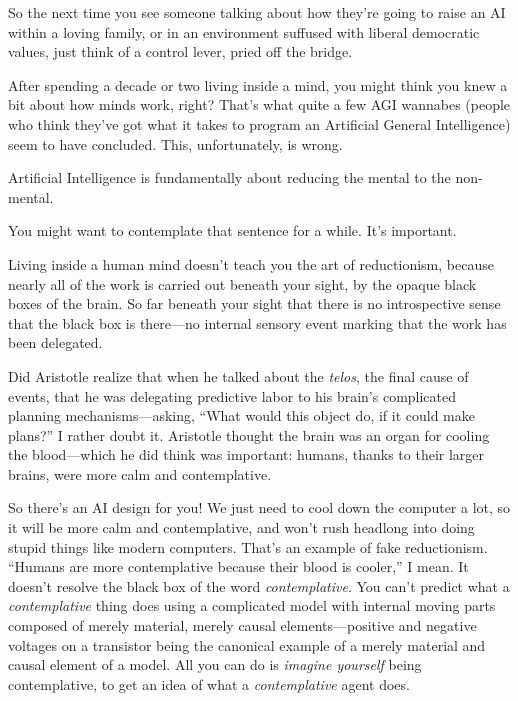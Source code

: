 {
 So the next time you see someone talking about how
they're going to raise an AI within a loving family, or
in an environment suffused with liberal democratic values, just think
of a control lever, pried off the bridge.}

\myendsectiontext


\bigskip


{
 After spending a decade or two living inside a mind, you might
think you knew a bit about how minds work, right?
That's what quite a few AGI wannabes (people who think
they've got what it takes to program an Artificial
General Intelligence) seem to have concluded. This, unfortunately, is
wrong. }

{
 Artificial Intelligence is fundamentally about reducing the mental
to the non-mental.}

{
 You might want to contemplate that sentence for a while.
It's important.}

{
 Living inside a human mind doesn't teach you the
art of reductionism, because nearly all of the work is carried out
beneath your sight, by the opaque black boxes of the brain. So far
beneath your sight that there is no introspective sense that the black
box is there---no internal sensory event marking that the work has been
delegated.}

{
 Did Aristotle realize that when he talked about the
\textit{telos}, the final cause of events, that he was delegating
predictive labor to his brain's complicated planning
mechanisms---asking, ``What would this object do, if
it could make plans?'' I rather doubt it. Aristotle
thought the brain was an organ for cooling the blood---which he did
think was important: humans, thanks to their larger brains, were more
calm and contemplative.}

{
 So there's an AI design for you! We just need to
cool down the computer a lot, so it will be more calm and
contemplative, and won't rush headlong into doing
stupid things like modern computers. That's an example
of fake reductionism. ``Humans are more contemplative
because their blood is cooler,'' I mean. It
doesn't resolve the black box of the word
\textit{contemplative}. You can't predict what a
\textit{contemplative} thing does using a complicated model with
internal moving parts composed of merely material, merely causal
elements---positive and negative voltages on a transistor being the
canonical example of a merely material and causal element of a model.
All you can do is \textit{imagine yourself} being contemplative, to get
an idea of what a \textit{contemplative} agent does.}

